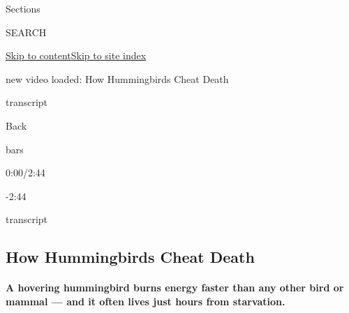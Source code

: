 Sections

SEARCH

\protect\hyperlink{site-content}{Skip to
content}\protect\hyperlink{site-index}{Skip to site index}

new video loaded: How Hummingbirds Cheat Death

transcript

Back

bars

0:00/2:44

-2:44

transcript

\hypertarget{how-hummingbirds-cheat-death}{%
\subsection{How Hummingbirds Cheat
Death}\label{how-hummingbirds-cheat-death}}

\hypertarget{a-hovering-hummingbird-burns-energy-faster-than-any-other-bird-or-mammal--and-it-often-lives-just-hours-from-starvation}{%
\paragraph{A hovering hummingbird burns energy faster than any other
bird or mammal --- and it often lives just hours from
starvation.}\label{a-hovering-hummingbird-burns-energy-faster-than-any-other-bird-or-mammal--and-it-often-lives-just-hours-from-starvation}}

